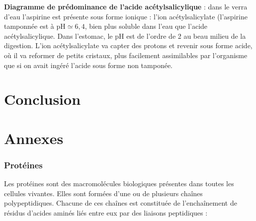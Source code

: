 \documentclass[11pt,a4paper]{report}
\begin{document}
\textbf{Diagramme de prédominance de l'acide acétylsalicylique} : dans le verra d'eau l'aspirine est présente sous forme ionique : l'ion acétylsalicylate (l'aspirine tamponnée est à $\text{pH} \simeq 6,4$, bien plus soluble dans l'eau que l'acide acétylsalicylique. Dans l'estomac, le pH est de l'ordre de 2 au beau milieu de la digestion. L'ion acétylsalicylate va capter des protons et revenir sous forme acide, où il va reformer de petits cristaux, plus facilement assimilables par l'organisme que si on avait ingéré l'acide sous forme non tamponée.


\newpage
\section*{Conclusion}

\newpage
\section*{Annexes}

\subsubsection*{Protéines}

Les protéines sont des macromolécules biologiques présentes dans toutes les cellules vivantes. Elles sont formées d'une ou de plusieurs chaînes polypeptidiques. Chacune de ces chaînes est constituée de l'enchaînement de résidus d'acides aminés liés entre eux par des liaisons peptidiques :
\end{document}
